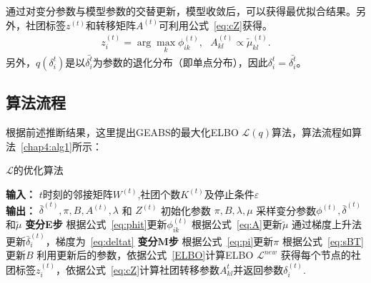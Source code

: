通过对变分参数与模型参数的交替更新，模型收敛后，可以获得最优拟合结果。另外，社团标签$z^{(t)}$和转移矩阵$A^{(t)}$可利用公式~\ref{eq:cZ}获得。
\begin{equation}
\begin{split}
z^{(t)}_i = \arg \max_k \phi_{ik}^{(t)}, ~~~A_{kl}^{(t)} \propto \tilde{\mu}_{kl}^{(t)}.
\end{split}
\label{eq:cZ}
\end{equation}
另外，$q(\delta_i^t)$是以$\bar{\delta_i^t}$为参数的退化分布（即单点分布），因此$\delta_i^t = \bar{\delta_i^t}$。



\subsection{算法流程}
根据前述推断结果，这里提出GEABS的最大化ELBO $\mathscr{L}(q)$算法，算法流程如算法~\ref{chap4:alg1}所示：

\begin{algorithm}[H]
\caption{$\mathcal{L}$的优化算法}\label{chap4:alg1}

\begin{algorithmic}[1]
\STATE \textbf{输入：} $t$时刻的邻接矩阵$W^{(t)}$,社团个数$K^{(t)}$及停止条件$\varepsilon$\\
\STATE \textbf{输出：} $\bar{\delta}^{(t)}, \pi, B, A^{(t)},\lambda$ 和 $Z^{(t)}$
\STATE 初始化参数 $\pi,B,\lambda, \mu$
\STATE 采样变分参数$\phi^{(t)},\bar{\delta}^{(t)}$和$\tilde{\mu}$
\REPEAT
    \STATE \textbf{变分E步}
    \STATE 根据公式~\ref{eq:phit}更新$\phi^{(t)}_{ik}$
    \STATE 根据公式~\ref{eq:A}更新$\tilde{\mu}$
     \STATE 通过梯度上升法更新$\bar{\delta}_i^{(t)}$，梯度为~\ref{eq:deltat}
    \STATE \textbf{变分M步}
    \STATE 根据公式~\ref{eq:pi}更新$\pi$
    \STATE 根据公式~\ref{eq:sBT}更新$B$
    \STATE 利用更新后的参数，依据公式~\ref{ELBO}计算ELBO $\mathcal{L}^{new}$
\ENDFOR
{}
\STATE 获得每个节点的社团标签$z^{(t)}_i$，依据公式~\ref{eq:cZ}计算社团转移参数$A_{kl}^t$并返回参数$\delta^{(t)}_i$.
\ENDFOR  
\end{algorithmic}
\end{algorithm}

